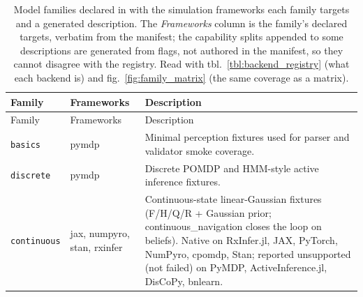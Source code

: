 \documentclass[
  english,
  9pt,
]{extarticle}
\begin{document}
\begin{longtable}[]{@{}
  >{\raggedright\arraybackslash}p{}
  >{\raggedright\arraybackslash}p{}
  >{\raggedright\arraybackslash}p{}@{}}
\caption{Model families declared in
\protect{} with the simulation
frameworks each family targets and a generated description. The
\emph{Frameworks} column is the family's declared targets, verbatim from
the manifest; the capability splits appended to some descriptions are
generated from \protect{}
flags, not authored in the manifest, so they cannot disagree with the
registry. Read with tbl.~\ref{tbl:backend_registry} (what each backend
is) and fig.~\ref{fig:family_matrix} (the same coverage as a
matrix).}\label{tbl:model_families}\tabularnewline
\toprule\noalign{}
\begin{minipage}[b]{\linewidth}\raggedright
Family
\end{minipage} & \begin{minipage}[b]{\linewidth}\raggedright
Frameworks
\end{minipage} & \begin{minipage}[b]{\linewidth}\raggedright
Description
\end{minipage} \\
\midrule\noalign{}
\endfirsthead
\toprule\noalign{}
\begin{minipage}[b]{\linewidth}\raggedright
Family
\end{minipage} & \begin{minipage}[b]{\linewidth}\raggedright
Frameworks
\end{minipage} & \begin{minipage}[b]{\linewidth}\raggedright
Description
\end{minipage} \\
\midrule\noalign{}
\endhead
\bottomrule\noalign{}
\endlastfoot
\texttt{basics} & pymdp & Minimal perception fixtures used for parser
and validator smoke coverage. \\
\texttt{discrete} & pymdp & Discrete POMDP and HMM-style active
inference fixtures. \\
\texttt{continuous} & jax, numpyro, stan, rxinfer & Continuous-state
linear-Gaussian fixtures (F/H/Q/R + Gaussian prior;
continuous\_navigation closes the loop on beliefs). Native on
RxInfer.jl, JAX, PyTorch, NumPyro, cpomdp, Stan; reported unsupported
(not failed) on PyMDP, ActiveInference.jl, DisCoPy, bnlearn. \\

\end{longtable}
\end{document}
